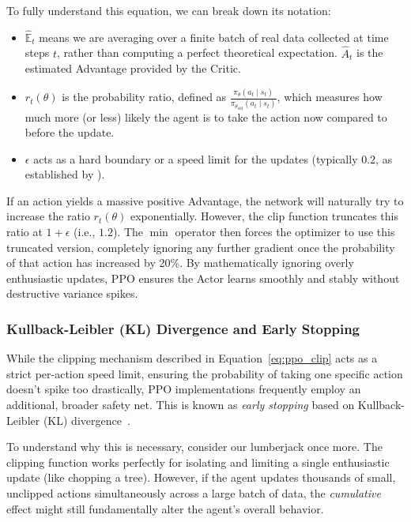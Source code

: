 To fully understand this equation, we can break down its notation:
\begin{itemize}
    \item $\hat{\mathbb{E}}_t$ means we are averaging over a finite batch of real data collected at time steps $t$, rather than computing a perfect theoretical expectation. $\hat{A}_t$ is the estimated Advantage provided by the Critic.
    \item $r_t(\theta)$ is the probability ratio, defined as $\frac{\pi_\theta(a_t \mid s_t)}{\pi_{\theta_{\text{old}}}(a_t \mid s_t)}$, which measures how much more (or less) likely the agent is to take the action now compared to before the update.
    \item $\epsilon$ acts as a hard boundary or a speed limit for the updates (typically $0.2$, as established by \textcite{Schulman_Wolski_Dhariwal_Radford_Klimov_2017}).
\end{itemize}

If an action yields a massive positive Advantage, the network will naturally try to increase the ratio $r_t(\theta)$ exponentially. However, the $\text{clip}$ function truncates this ratio at $1 + \epsilon$ (i.e., $1.2$). The $\min$ operator then forces the optimizer to use this truncated version, completely ignoring any further gradient once the probability of that action has increased by 20\%. By mathematically ignoring overly enthusiastic updates, PPO ensures the Actor learns smoothly and stably without destructive variance spikes.

\subsubsection{Kullback-Leibler (KL) Divergence and Early Stopping}
\label{subsec:kl_divergence}

While the clipping mechanism described in Equation~\ref{eq:ppo_clip} acts as a strict per-action speed limit, ensuring the probability of taking one specific action doesn't spike too drastically, PPO implementations frequently employ an additional, broader safety net. This is known as \emph{early stopping} based on Kullback-Leibler (KL) divergence~\parencite{Schulman_Wolski_Dhariwal_Radford_Klimov_2017}.

To understand why this is necessary, consider our lumberjack once more. The clipping function works perfectly for isolating and limiting a single enthusiastic update (like chopping a tree). However, if the agent updates thousands of small, unclipped actions simultaneously across a large batch of data, the \emph{cumulative} effect might still fundamentally alter the agent's overall behavior. 


